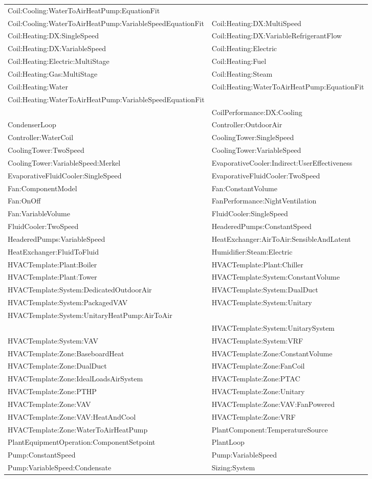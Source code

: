 \begin{longtable}[c]{p{3.3in}p{3.3in}}
Coil:Cooling:WaterToAirHeatPump:EquationFit & \tabularnewline
Coil:Cooling:WaterToAirHeatPump:VariableSpeedEquationFit & Coil:Heating:DX:MultiSpeed \tabularnewline
Coil:Heating:DX:SingleSpeed & Coil:Heating:DX:VariableRefrigerantFlow \tabularnewline
Coil:Heating:DX:VariableSpeed & Coil:Heating:Electric \tabularnewline
Coil:Heating:Electric:MultiStage & Coil:Heating:Fuel \tabularnewline
Coil:Heating:Gas:MultiStage & Coil:Heating:Steam \tabularnewline
Coil:Heating:Water & Coil:Heating:WaterToAirHeatPump:EquationFit \tabularnewline
Coil:Heating:WaterToAirHeatPump:VariableSpeedEquationFit & \tabularnewline
 & CoilPerformance:DX:Cooling \tabularnewline
CondenserLoop & Controller:OutdoorAir \tabularnewline
Controller:WaterCoil & CoolingTower:SingleSpeed \tabularnewline
CoolingTower:TwoSpeed & CoolingTower:VariableSpeed \tabularnewline
CoolingTower:VariableSpeed:Merkel & EvaporativeCooler:Indirect:UserEffectiveness \tabularnewline
EvaporativeFluidCooler:SingleSpeed & EvaporativeFluidCooler:TwoSpeed \tabularnewline
Fan:ComponentModel & Fan:ConstantVolume \tabularnewline
Fan:OnOff & FanPerformance:NightVentilation \tabularnewline
Fan:VariableVolume & FluidCooler:SingleSpeed \tabularnewline
FluidCooler:TwoSpeed & HeaderedPumps:ConstantSpeed \tabularnewline
HeaderedPumps:VariableSpeed & HeatExchanger:AirToAir:SensibleAndLatent \tabularnewline
HeatExchanger:FluidToFluid & Humidifier:Steam:Electric \tabularnewline
HVACTemplate:Plant:Boiler & HVACTemplate:Plant:Chiller \tabularnewline
HVACTemplate:Plant:Tower & HVACTemplate:System:ConstantVolume \tabularnewline
HVACTemplate:System:DedicatedOutdoorAir & HVACTemplate:System:DualDuct \tabularnewline
HVACTemplate:System:PackagedVAV & HVACTemplate:System:Unitary \tabularnewline
HVACTemplate:System:UnitaryHeatPump:AirToAir & \tabularnewline
 & HVACTemplate:System:UnitarySystem \tabularnewline
HVACTemplate:System:VAV & HVACTemplate:System:VRF \tabularnewline
HVACTemplate:Zone:BaseboardHeat & HVACTemplate:Zone:ConstantVolume \tabularnewline
HVACTemplate:Zone:DualDuct & HVACTemplate:Zone:FanCoil \tabularnewline
HVACTemplate:Zone:IdealLoadsAirSystem & HVACTemplate:Zone:PTAC \tabularnewline
HVACTemplate:Zone:PTHP & HVACTemplate:Zone:Unitary \tabularnewline
HVACTemplate:Zone:VAV & HVACTemplate:Zone:VAV:FanPowered \tabularnewline
HVACTemplate:Zone:VAV:HeatAndCool & HVACTemplate:Zone:VRF \tabularnewline
HVACTemplate:Zone:WaterToAirHeatPump & PlantComponent:TemperatureSource \tabularnewline
PlantEquipmentOperation:ComponentSetpoint & PlantLoop \tabularnewline
Pump:ConstantSpeed & Pump:VariableSpeed \tabularnewline
Pump:VariableSpeed:Condensate & Sizing:System \tabularnewline

\end{longtable}
